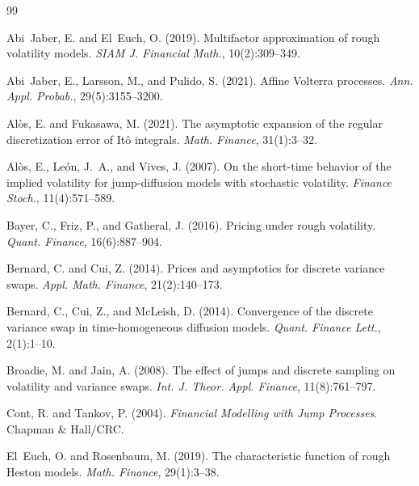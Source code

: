 \documentclass[12pt]{article}
\theoremstyle{definition}
\begin{document}

\begin{thebibliography}{99}

Abi~Jaber, E. and El~Euch, O. (2019).
Multifactor approximation of rough volatility models.
\emph{SIAM J. Financial Math.}, 10(2):309--349.

Abi~Jaber, E., Larsson, M., and Pulido, S. (2021).
Affine Volterra processes.
\emph{Ann. Appl. Probab.}, 29(5):3155--3200.

Al\`os, E. and Fukasawa, M. (2021).
The asymptotic expansion of the regular discretization error of
It\^o integrals.
\emph{Math. Finance}, 31(1):3--32.

Al\`os, E., Le\'on, J.~A., and Vives, J. (2007).
On the short-time behavior of the implied volatility for
jump-diffusion models with stochastic volatility.
\emph{Finance Stoch.}, 11(4):571--589.

Bayer, C., Friz, P., and Gatheral, J. (2016).
Pricing under rough volatility.
\emph{Quant. Finance}, 16(6):887--904.

Bernard, C. and Cui, Z. (2014).
Prices and asymptotics for discrete variance swaps.
\emph{Appl. Math. Finance}, 21(2):140--173.

Bernard, C., Cui, Z., and McLeish, D. (2014).
Convergence of the discrete variance swap in time-homogeneous
diffusion models.
\emph{Quant. Finance Lett.}, 2(1):1--10.

Broadie, M. and Jain, A. (2008).
The effect of jumps and discrete sampling on volatility and
variance swaps.
\emph{Int. J. Theor. Appl. Finance}, 11(8):761--797.

Cont, R. and Tankov, P. (2004).
\emph{Financial Modelling with Jump Processes}.
Chapman \& Hall/CRC.

El~Euch, O. and Rosenbaum, M. (2019).
The characteristic function of rough Heston models.
\emph{Math. Finance}, 29(1):3--38.


\end{thebibliography}
\end{document}
